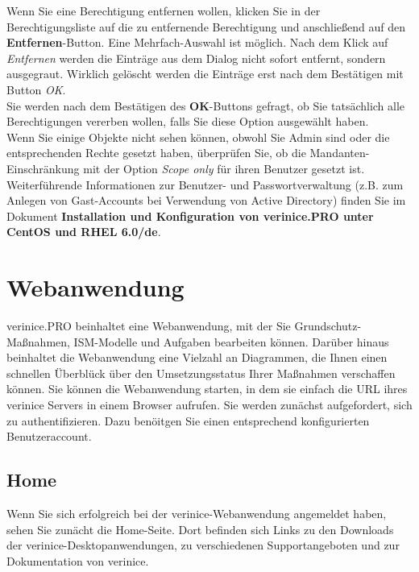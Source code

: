 \documentclass[a4paper,10pt]{book}
\begin{document}
Wenn Sie eine Berechtigung entfernen wollen, klicken Sie in der Berechtigungsliste auf die zu entfernende Berechtigung und anschließend auf den
\textbf{Entfernen}-Button. Eine Mehrfach-Auswahl ist möglich. Nach dem Klick auf \textit{Entfernen} werden die Einträge aus dem Dialog nicht sofort entfernt, sondern ausgegraut. Wirklich gelöscht werden die Einträge erst nach dem Bestätigen mit Button \textit{OK}.
\newline\\
Sie werden nach dem Bestätigen des \textbf{OK}-Buttons gefragt, ob Sie tatsächlich alle Berechtigungen vererben wollen, falls Sie diese Option
ausgewählt haben.
\newline\\
Wenn Sie einige Objekte nicht sehen können, obwohl Sie Admin sind oder die entsprechenden Rechte gesetzt haben, überprüfen Sie, ob die
Mandanten-Einschränkung mit der Option \textit{Scope only} für ihren Benutzer gesetzt ist.
\newline\\
Weiterführende Informationen zur Benutzer- und Passwortverwaltung (z.B. zum Anlegen von Gast-Accounts bei Verwendung von Active Directory)
finden Sie im Dokument \textbf{Installation und Konfiguration von verinice.\textsc{PRO} unter CentOS und RHEL 6.0/de}.


\section{Webanwendung}
\label{webanwendung}

verinice.PRO beinhaltet eine Webanwendung, mit der Sie Grundschutz-Maßnahmen,
ISM-Modelle und Aufgaben bearbeiten können. Darüber hinaus beinhaltet die
Webanwendung eine Vielzahl an Diagrammen, die Ihnen einen schnellen Überblück
über den Umsetzungsstatus Ihrer Maßnahmen verschaffen können. Sie können die
Webanwendung starten, in dem sie einfach die URL ihres verinice Servers in einem
Browser aufrufen. Sie werden zunächst aufgefordert, sich zu authentifizieren.
Dazu benöitgen Sie einen entsprechend konfigurierten Benutzeraccount.


\subsection{Home}

Wenn Sie sich erfolgreich bei der verinice-Webanwendung angemeldet haben, sehen
Sie zunächt die Home-Seite. Dort befinden sich Links zu den Downloads der
verinice-Desktopanwendungen, zu verschiedenen Supportangeboten und zur
Dokumentation von verinice.
\end{document}
